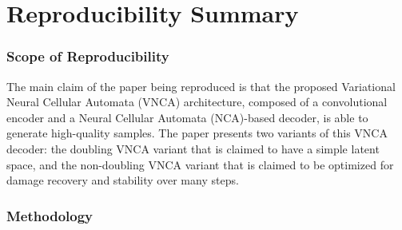 \section*{\centering Reproducibility Summary}


\subsubsection*{Scope of Reproducibility}


The main claim of the paper being reproduced is that the proposed Variational Neural Cellular Automata (VNCA) architecture, composed of a convolutional encoder and a Neural Cellular Automata (NCA)-based decoder, is able to generate high-quality samples.
The paper presents two variants of this VNCA decoder: the doubling VNCA variant that is claimed to have a simple latent space, and the non-doubling VNCA variant that is claimed to be optimized for damage recovery and stability over many steps.



\subsubsection*{Methodology}


